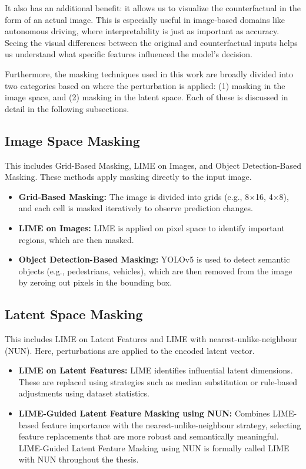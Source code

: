 It also has an additional benefit: it allows us to visualize the counterfactual in the form of an actual image. This is especially useful in image-based domains like autonomous driving, where interpretability is just as important as accuracy. Seeing the visual differences between the original and counterfactual inputs helps us understand what specific features influenced the model’s decision.


Furthermore, the masking techniques used in this work are broadly divided into two categories based on where the perturbation is applied: (1) masking in the image space, and (2) masking in the latent space. Each of these is discussed in detail in the following subsections.

\subsection*{Image Space Masking}
This includes Grid-Based Masking, LIME on Images, and Object Detection-Based Masking. These methods apply masking directly to the input image.
\begin{itemize}
    \item \textbf{Grid-Based Masking:} The image is divided into grids (e.g., 8$\times$16, 4$\times$8), and each cell is masked iteratively to observe prediction changes.
    \item \textbf{LIME on Images:} LIME is applied on pixel space to identify important regions, which are then masked.
    \item \textbf{Object Detection-Based Masking:} YOLOv5 is used to detect semantic objects (e.g., pedestrians, vehicles), which are then removed from the image by zeroing out pixels in the bounding box.
\end{itemize}

\subsection*{Latent Space Masking}
This includes LIME on Latent Features and LIME with nearest-unlike-neighbour (NUN). Here, perturbations are applied to the encoded latent vector.
\begin{itemize}
    \item \textbf{LIME on Latent Features:} LIME identifies influential latent dimensions. These are replaced using strategies such as median substitution or rule-based adjustments using dataset statistics.
    \item \textbf{LIME-Guided Latent Feature Masking using NUN:} Combines LIME-based feature importance with the nearest-unlike-neighbour strategy, selecting feature replacements that are more robust and semantically meaningful. LIME-Guided Latent Feature Masking using NUN is formally called LIME with NUN throughout the thesis.
\end{itemize}

